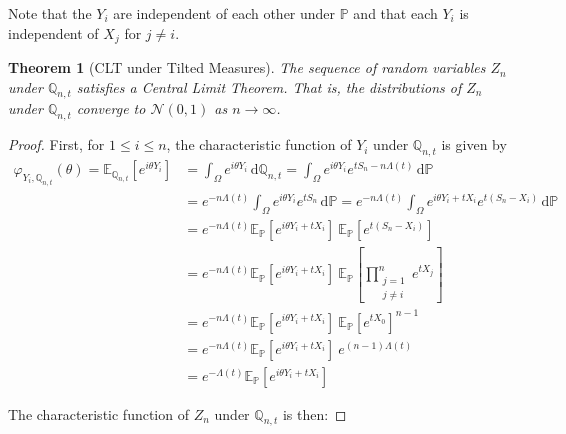 \documentclass{article}
\newtheorem{theorem}{Theorem}[section]
\newcommand{\E}{\mathbb{E}}
\renewcommand{\P}{\mathbb{P}}
\newcommand{\Q}{\mathbb{Q}}
\begin{document}
Note that the $Y_i$ are independent of each other under $\P$ and that each $Y_i$ is independent of $X_j$ for $j \ne i$.

\newpage
\begin{theorem}[CLT under Tilted Measures]
  \label{thm:clt_tilted}
  The sequence of random variables $Z_n$ under $\Q_{n,t}$ satisfies a Central Limit Theorem. That is, the distributions of $Z_n$ under $\Q_{n,t}$ converge to $\mathcal{N}(0, 1)$ as
  $n\to\infty$.
\end{theorem}

\begin{proof}
  First, for $1 \le i \le n$, the characteristic function of $Y_i$ under $\Q_{n,t}$ is given by
  \begin{equation}
    \begin{aligned}
      \varphi_{Y_i,\Q_{n,t}}(\theta) = \E_{\Q_{n,t}}\left[ e^{i \theta Y_i} \right]
      &= \int_\Omega  e^{i \theta Y_i} \, \text{d}\Q_{n,t}
      = \int_\Omega  e^{i \theta Y_i} e^{t S_n - n \Lambda(t)} \, \text{d}\P \\
      &=  e^{-n\Lambda(t)}\int_\Omega  e^{i \theta Y_i} e^{t S_n} \, \text{d}\P
      =  e^{-n\Lambda(t)}\int_\Omega  e^{i \theta Y_i + tX_i} e^{t (S_n - X_i)} \, \text{d}\P\\
      &= e^{-n\Lambda(t)} \E_\P[ e^{i \theta Y_i + tX_i}]~ \E_\P[e^{t (S_n - X_i)}] \\
      &= e^{-n\Lambda(t)} \E_\P[ e^{i \theta Y_i + tX_i}]~ \E_\P\left[\prod_{\substack{j=1 \\ j \ne i}}^n e^{tX_j}\right] \\
      &= e^{-n\Lambda(t)} \E_\P[ e^{i \theta Y_i + tX_i}]~ \E_\P[e^{t X_0}]^{n-1} \\
      &= e^{-n\Lambda(t)} \E_\P[ e^{i \theta Y_i + tX_i}]~ e^{(n-1)\Lambda(t)} \\
      &= \boxed{e^{-\Lambda(t)} \E_\P[ e^{i \theta Y_i + tX_i}]}
    \end{aligned}
  \end{equation}

  The characteristic function of $Z_n$ under $\Q_{n,t}$ is then:


\end{proof}
\end{document}
